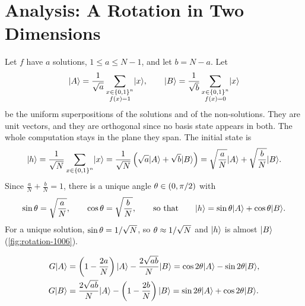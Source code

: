 \section{Analysis: A Rotation in Two Dimensions}\label{sec:grover-analysis-1006}

Let $f$ have $a$ solutions, $1 \leq a \leq N - 1$, and let $b = N - a$. Let
\[\lvert A \rangle = \frac{1}{\sqrt{a}} \sum_{\substack{x \in \left\lbrace0,1\right\rbrace^n \\ f(x) = 1}} \lvert x \rangle,
    \qquad
    \lvert B \rangle = \frac{1}{\sqrt{b}} \sum_{\substack{x \in \left\lbrace0,1\right\rbrace^n \\ f(x) = 0}} \lvert x \rangle\]
be the uniform superpositions of the solutions and of the non-solutions. They are unit vectors, and
they are orthogonal since no basis state appears in both. The whole computation stays in the plane
they span. The initial state is
\begin{equation}\label{eq:h-AB-1006}
    \lvert h \rangle = \frac{1}{\sqrt{N}} \sum_{x \in \left\lbrace0,1\right\rbrace^n} \lvert x \rangle
    = \frac{1}{\sqrt{N}} \left(\sqrt{a} \lvert A \rangle + \sqrt{b} \lvert B \rangle\right)
    = \sqrt{\frac{a}{N}} \lvert A \rangle + \sqrt{\frac{b}{N}} \lvert B \rangle.
\end{equation}
Since $\frac{a}{N} + \frac{b}{N} = 1$, there is a unique angle $\theta \in (0, \pi/2)$ with
\[\sin\theta = \sqrt{\frac{a}{N}}, \qquad \cos\theta = \sqrt{\frac{b}{N}},
    \qquad \text{so that} \qquad \lvert h \rangle = \sin\theta \lvert A \rangle + \cos\theta \lvert B \rangle.\]
For a unique solution, $\sin\theta = 1/\sqrt{N}$, so $\theta \approx 1/\sqrt{N}$ and
$\lvert h \rangle$ is almost $\lvert B \rangle$ (\cref{fig:rotation-1006}).

\begin{lemma}\label{lem:giter-1006}
    \begin{align*}
        G\lvert A \rangle & = \left(1 - \frac{2a}{N}\right)\lvert A \rangle - \frac{2\sqrt{ab}}{N}\lvert B \rangle
        = \cos 2\theta \lvert A \rangle - \sin 2\theta \lvert B \rangle,                                 \\
        G\lvert B \rangle & = \frac{2\sqrt{ab}}{N}\lvert A \rangle - \left(1 - \frac{2b}{N}\right)\lvert B \rangle
        = \sin 2\theta \lvert A \rangle + \cos 2\theta \lvert B \rangle.
    \end{align*}
\end{lemma}

